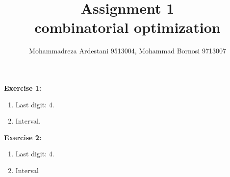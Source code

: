 \documentclass[11pt]{article}
\begin{document}
\author{Mohammadreza Ardestani 9513004, Mohammad Bornosi 9713007}
\title{Assignment 1  \\ combinatorial optimization }
\maketitle


\textbf{\huge Exercise 1:}\\
\begin{enumerate}
	\item
	Last digit: 4.
	\item
	Interval.\\
    

\end{enumerate}

\textbf{\huge Exercise 2:}\\
\begin{enumerate}
	\item
	Last digit: 4.
	\item
	Interval
    

\end{enumerate}
\end{document}
